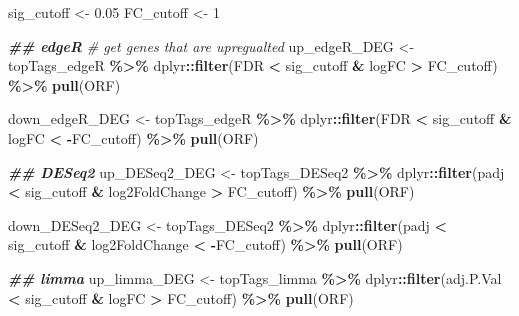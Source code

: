 \documentclass[
]{book}
\newenvironment{Shaded}{\begin{snugshade}}{\end{snugshade}}
\newcommand{\CommentTok}[1]{\textcolor[rgb]{0.56,0.35,0.01}{\textit{#1}}}
\newcommand{\DecValTok}[1]{\textcolor[rgb]{0.00,0.00,0.81}{#1}}
\newcommand{\DocumentationTok}[1]{\textcolor[rgb]{0.56,0.35,0.01}{\textbf{\textit{#1}}}}
\newcommand{\FloatTok}[1]{\textcolor[rgb]{0.00,0.00,0.81}{#1}}
\newcommand{\FunctionTok}[1]{\textcolor[rgb]{0.13,0.29,0.53}{\textbf{#1}}}
\newcommand{\NormalTok}[1]{#1}
\newcommand{\OtherTok}[1]{\textcolor[rgb]{0.56,0.35,0.01}{#1}}
\newcommand{\SpecialCharTok}[1]{\textcolor[rgb]{0.81,0.36,0.00}{\textbf{#1}}}
\begin{document}
\begin{Shaded}
\begin{Highlighting}[]
\NormalTok{sig\_cutoff }\OtherTok{\textless{}{-}} \FloatTok{0.05}
\NormalTok{FC\_cutoff }\OtherTok{\textless{}{-}} \DecValTok{1}

\DocumentationTok{\#\# edgeR}
\CommentTok{\# get genes that are upregualted}
\NormalTok{up\_edgeR\_DEG }\OtherTok{\textless{}{-}}\NormalTok{ topTags\_edgeR }\SpecialCharTok{\%\textgreater{}\%}
\NormalTok{  dplyr}\SpecialCharTok{::}\FunctionTok{filter}\NormalTok{(FDR }\SpecialCharTok{\textless{}}\NormalTok{ sig\_cutoff }\SpecialCharTok{\&}\NormalTok{ logFC }\SpecialCharTok{\textgreater{}}\NormalTok{ FC\_cutoff) }\SpecialCharTok{\%\textgreater{}\%}
  \FunctionTok{pull}\NormalTok{(ORF)}

\NormalTok{down\_edgeR\_DEG }\OtherTok{\textless{}{-}}\NormalTok{ topTags\_edgeR }\SpecialCharTok{\%\textgreater{}\%}
\NormalTok{  dplyr}\SpecialCharTok{::}\FunctionTok{filter}\NormalTok{(FDR }\SpecialCharTok{\textless{}}\NormalTok{ sig\_cutoff }\SpecialCharTok{\&}\NormalTok{ logFC }\SpecialCharTok{\textless{}} \SpecialCharTok{{-}}\NormalTok{FC\_cutoff) }\SpecialCharTok{\%\textgreater{}\%}
  \FunctionTok{pull}\NormalTok{(ORF)}

\DocumentationTok{\#\# DESeq2}
\NormalTok{up\_DESeq2\_DEG }\OtherTok{\textless{}{-}}\NormalTok{ topTags\_DESeq2 }\SpecialCharTok{\%\textgreater{}\%}
\NormalTok{  dplyr}\SpecialCharTok{::}\FunctionTok{filter}\NormalTok{(padj }\SpecialCharTok{\textless{}}\NormalTok{ sig\_cutoff }\SpecialCharTok{\&}\NormalTok{ log2FoldChange }\SpecialCharTok{\textgreater{}}\NormalTok{ FC\_cutoff) }\SpecialCharTok{\%\textgreater{}\%}
  \FunctionTok{pull}\NormalTok{(ORF)}

\NormalTok{down\_DESeq2\_DEG }\OtherTok{\textless{}{-}}\NormalTok{ topTags\_DESeq2 }\SpecialCharTok{\%\textgreater{}\%}
\NormalTok{  dplyr}\SpecialCharTok{::}\FunctionTok{filter}\NormalTok{(padj }\SpecialCharTok{\textless{}}\NormalTok{ sig\_cutoff }\SpecialCharTok{\&}\NormalTok{ log2FoldChange }\SpecialCharTok{\textless{}} \SpecialCharTok{{-}}\NormalTok{FC\_cutoff) }\SpecialCharTok{\%\textgreater{}\%}
  \FunctionTok{pull}\NormalTok{(ORF)}

\DocumentationTok{\#\# limma}
\NormalTok{up\_limma\_DEG }\OtherTok{\textless{}{-}}\NormalTok{ topTags\_limma }\SpecialCharTok{\%\textgreater{}\%}
\NormalTok{  dplyr}\SpecialCharTok{::}\FunctionTok{filter}\NormalTok{(adj.P.Val }\SpecialCharTok{\textless{}}\NormalTok{ sig\_cutoff }\SpecialCharTok{\&}\NormalTok{ logFC }\SpecialCharTok{\textgreater{}}\NormalTok{ FC\_cutoff) }\SpecialCharTok{\%\textgreater{}\%}
  \FunctionTok{pull}\NormalTok{(ORF)}


\end{Highlighting}
\end{Shaded}
\end{document}
